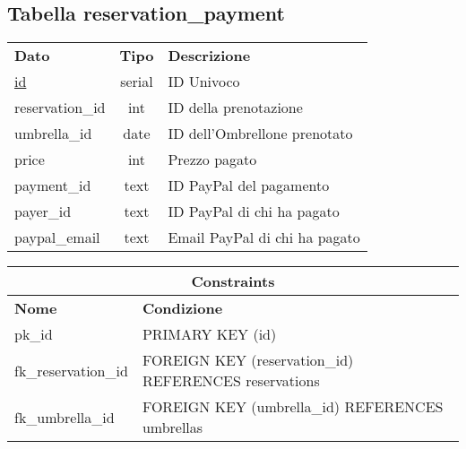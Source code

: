 \begin{center}
    \subsection*{Tabella \textnormal{reservation\_payment}}
    
    \begin{tabularx}{\textwidth}{l c X}
        \toprule
        \textbf{Dato} & \textbf{Tipo} & \textbf{Descrizione}\\
        \underline{id} & serial & ID Univoco \\
        reservation\_id & int & ID della prenotazione\\
        umbrella\_id & date & ID dell'Ombrellone prenotato\\
        price & int & Prezzo pagato\\
        payment\_id & text & ID PayPal del pagamento\\
        payer\_id & text & ID PayPal di chi ha pagato\\
        paypal\_email & text & Email PayPal di chi ha pagato\\
        \midrule
    \end{tabularx}
    \begin{tabularx}{\textwidth}{l X}
        \multicolumn{2}{c}{\textbf{Constraints}}\\
        \midrule
        \textbf{Nome} & \textbf{Condizione}\\
        pk\_id & PRIMARY KEY (id)\\
        fk\_reservation\_id & FOREIGN KEY (reservation\_id) REFERENCES reservations\\
        fk\_umbrella\_id & FOREIGN KEY (umbrella\_id) REFERENCES umbrellas\\
        \bottomrule
    \end{tabularx}
    \bigskip
\end{center}

